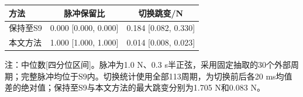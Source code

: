 \begin{table}[!htbp]
\centering
{}
\label{tab:pulse-switch}
\small\setlength{\tabcolsep}{2pt}
\begin{tabular}{lcc}
\toprule
方法 & 脉冲保留比 & 切换跳变/N\\
\midrule
保持至S9 & 0.000 [0.000, 0.000] & 0.184 [0.082, 0.330]\\
本文方法 & 1.000 [1.000, 1.000] & 0.014 [0.008, 0.023]\\
\bottomrule
\end{tabular}
\par\vspace{2pt}
{\footnotesize 注：中位数[四分位区间]。脉冲为1.0 N、0.3 s半正弦，采用固定抽取的30个外部周期；完整脉冲均位于S9内。切换统计使用全部113周期，为切换前后各20 ms均值差的绝对值；保持至S9与本文方法的最大跳变分别为1.705 N和0.083 N。}
\end{table}
